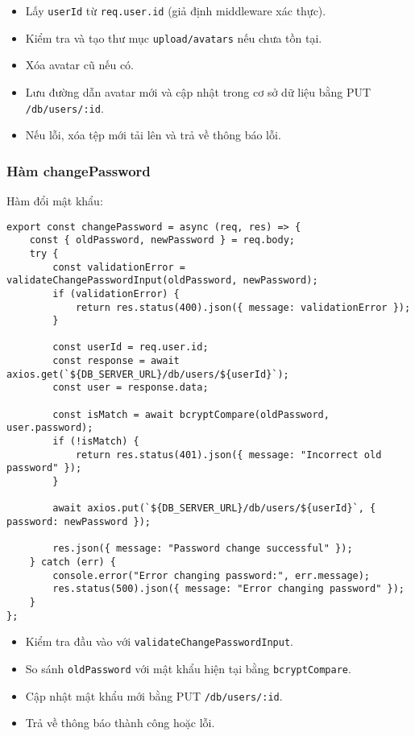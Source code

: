                 \begin{itemize}
                    \item Lấy \texttt{userId} từ \texttt{req.user.id} (giả định middleware xác thực).
                    \item Kiểm tra và tạo thư mục \texttt{upload/avatars} nếu chưa tồn tại.
                    \item Xóa avatar cũ nếu có.
                    \item Lưu đường dẫn avatar mới và cập nhật trong cơ sở dữ liệu bằng PUT \texttt{/db/users/:id}.
                    \item Nếu lỗi, xóa tệp mới tải lên và trả về thông báo lỗi.
                \end{itemize}

            \subsubsection{Hàm changePassword}
                \hspace*{0.6cm}Hàm đổi mật khẩu:
                \begin{lstlisting}
export const changePassword = async (req, res) => {
    const { oldPassword, newPassword } = req.body;
    try {
        const validationError = validateChangePasswordInput(oldPassword, newPassword);
        if (validationError) {
            return res.status(400).json({ message: validationError });
        }

        const userId = req.user.id;
        const response = await axios.get(`${DB_SERVER_URL}/db/users/${userId}`);
        const user = response.data;

        const isMatch = await bcryptCompare(oldPassword, user.password);
        if (!isMatch) {
            return res.status(401).json({ message: "Incorrect old password" });
        }

        await axios.put(`${DB_SERVER_URL}/db/users/${userId}`, { password: newPassword });

        res.json({ message: "Password change successful" });
    } catch (err) {
        console.error("Error changing password:", err.message);
        res.status(500).json({ message: "Error changing password" });
    }
};
                \end{lstlisting}
                \begin{itemize}
                    \item Kiểm tra đầu vào với \texttt{validateChangePasswordInput}.
                    \item So sánh \texttt{oldPassword} với mật khẩu hiện tại bằng \texttt{bcryptCompare}.
                    \item Cập nhật mật khẩu mới bằng PUT \texttt{/db/users/:id}.
                    \item Trả về thông báo thành công hoặc lỗi.
                \end{itemize}

